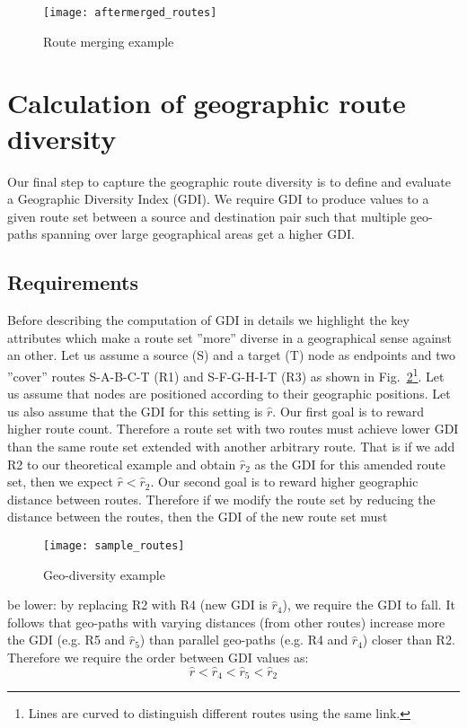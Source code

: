 \documentclass[peerreview]{IEEEtran}
\begin{document}
\begin{figure}[h]
	\centering
	\texttt{[image: aftermerged\_routes]}
	\caption{Route merging example}
	\label{fig:route_merging}
\end{figure}


\section{Calculation of geographic route diversity} \label{sec:sim} 

Our final step to capture the geographic route diversity is to define and
evaluate a Geographic Diversity Index (GDI). We require GDI to produce values to
a given route set between a source and destination pair such that multiple
geo-paths spanning over large geographical areas get a higher GDI.

\subsection{Requirements}\label{sec:req}
Before describing the computation of GDI in details we highlight the key
attributes which make a route set ''more'' diverse in a geographical sense
against an other. Let us assume a source (S) and a target (T) node as endpoints
and two ''cover'' routes S-A-B-C-T (R1) and S-F-G-H-I-T (R3) as shown in
Fig.~\ref{fig:route_example}\footnote{Lines are curved to distinguish different
  routes using the same link.}. Let us assume that nodes are positioned
according to their geographic positions. Let us also assume that the GDI for
this setting is $\hat{r}$. Our first goal is to reward higher route count.
Therefore a route set with two routes must achieve lower GDI than the same route
set extended with another arbitrary route. That is if we add R2 to our
theoretical example and obtain $\hat{r}_2$ as the GDI for this amended route
set, then we expect $\hat{r}<\hat{r}_2$. Our second goal is to reward higher
geographic distance between routes. Therefore if we modify the route set by
reducing the distance between the routes, then the GDI of the new route set must
\begin{figure}[h]
  \centering
  \texttt{[image: sample\_routes]}
  \caption{Geo-diversity example}
  \label{fig:route_example}
\end{figure}
be lower: by replacing R2 with R4 (new GDI is $\hat{r}_4$), we require the GDI
to fall. It follows that geo-paths with varying distances (from other routes)
increase more the GDI (e.g. R5 and $\hat{r}_5$) than parallel geo-paths (e.g. R4
and $\hat{r}_4$) closer than R2. Therefore we require the order between GDI
values as:
\begin{equation}\label{eq:order}
  \hat{r}<\hat{r}_4<\hat{r}_5<\hat{r}_2
\end{equation}
\end{document}
